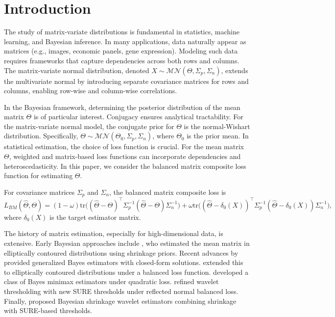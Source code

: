 \documentclass[twoside]{article}
\begin{document}
\section{Introduction}

The study of matrix-variate distributions is fundamental in statistics, machine learning, and Bayesian inference. In many applications, data naturally appear as matrices (e.g., images, economic panels, gene expression). Modeling such data requires frameworks that capture dependencies across both rows and columns. 
The matrix-variate normal distribution, denoted $X \sim \mathcal{MN}(\Theta, \Sigma_p, \Sigma_n)$, extends the multivariate normal by introducing separate covariance matrices for rows and columns, enabling row-wise and column-wise correlations. 

In the Bayesian framework, determining the posterior distribution of the mean matrix $\Theta$ is of particular interest. Conjugacy ensures analytical tractability. For the matrix-variate normal model, the conjugate prior for $\Theta$ is the normal-Wishart distribution. Specifically, $\Theta \sim \mathcal{MN}(\Theta_0, \Sigma_p, \Sigma_n)$, where $\Theta_0$ is the prior mean. 
In statistical estimation, the choice of loss function is crucial. For the mean matrix $\Theta$, weighted and matrix-based loss functions can incorporate dependencies and heteroscedasticity. In this paper, we consider the balanced matrix composite loss function for estimating $\Theta$.
\begin{dfn}
For covariance matrices $\Sigma_p$ and $\Sigma_n$, the balanced matrix composite loss is
    \begin{equation}
    L_{BM}(\hat{\Theta}, \Theta) = (1-\omega) \mathrm{tr}\Big( (\hat{\Theta} - \Theta)^\top \Sigma_p^{-1} (\hat{\Theta} - \Theta) \Sigma_n^{-1} \Big)
   + \omega  \mathrm{tr}\Big( (\hat{\Theta} - \delta_0(X))^\top \Sigma_p^{-1} (\hat{\Theta} - \delta_0(X)) \Sigma_n^{-1} \Big),
     \end{equation}
where $\delta_0(X)$ is the target estimator matrix.
\end{dfn}
The history of matrix estimation, especially for high-dimensional data, is extensive. Early Bayesian approaches include \cite{tsu2010}, who estimated the mean matrix in elliptically contoured distributions using shrinkage priors. Recent advances by  \cite{yua} provided generalized Bayes estimators with closed-form solutions.
 \cite{kar24} extended this to elliptically contoured distributions under a balanced loss function. \cite{zin} developed a class of Bayes minimax estimators under quadratic loss. \cite{kar25} refined wavelet thresholding with new SURE thresholds under reflected normal balanced loss. Finally, \cite{bat} proposed Bayesian shrinkage wavelet estimators combining shrinkage with SURE-based thresholds.
\end{document}
